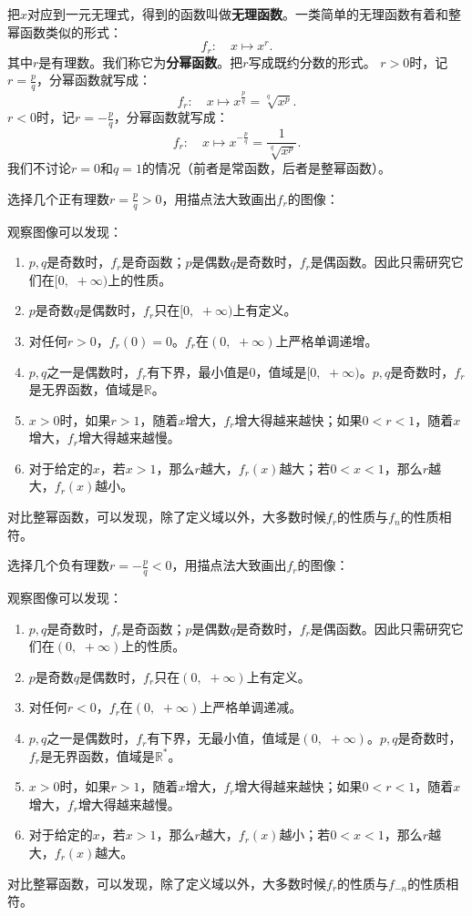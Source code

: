 \documentclass[12pt,UTF8]{ctexbook}
\begin{document}
把$x$对应到一元无理式，得到的函数叫做\textbf{无理函数}。一类简单的无理函数有着和整幂函数类似的形式：
$$ f_r : \quad x \mapsto x^r. $$
其中$r$是有理数。我们称它为\textbf{分幂函数}。把$r$写成既约分数的形式。
$r > 0$时，记$r = \frac{p}{q}$，分幂函数就写成：
$$ f_r : \quad x \mapsto x^\frac{p}{q} = \sqrt[q]{x^p}. $$
$r < 0$时，记$r = -\frac{p}{q}$，分幂函数就写成：
$$ f_r : \quad x \mapsto x^{-\frac{p}{q}} = \frac{1}{\sqrt[q]{x^p}} . $$
我们不讨论$r=0$和$q=1$的情况（前者是常函数，后者是整幂函数）。

选择几个正有理数$r = \frac{p}{q} > 0$，用描点法大致画出$f_r$的图像：


观察图像可以发现：
\begin{enumerate}
    \item $p, q$是奇数时，$f_r$是奇函数；$p$是偶数$q$是奇数时，$f_r$是偶函数。因此只需研究它们在$[0, \,\, +\infty)$上的性质。
    \item $p$是奇数$q$是偶数时，$f_r$只在$[0,\,\,  +\infty)$上有定义。
    \item 对任何$r > 0$，$f_r(0) = 0$。$f_r$在$(0, \,\, +\infty)$上严格单调递增。
    \item $p, q$之一是偶数时，$f_r$有下界，最小值是$0$，值域是$[0, \,\, +\infty)$。$p, q$是奇数时，$f_r$是无界函数，值域是$\mathbb{R}$。
    \item $x>0$时，如果$r>1$，随着$x$增大，$f_r$增大得越来越快；如果$0 < r < 1$，随着$x$增大，$f_r$增大得越来越慢。
    \item 对于给定的$x$，若$x>1$，那么$r$越大，$f_r(x)$越大；若$0 < x<1$，那么$r$越大，$f_r(x)$越小。
\end{enumerate}
对比整幂函数，可以发现，除了定义域以外，大多数时候$f_r$的性质与$f_n$的性质相符。

选择几个负有理数$r = -\frac{p}{q} < 0$，用描点法大致画出$f_r$的图像：


观察图像可以发现：
\begin{enumerate}
    \item $p, q$是奇数时，$f_r$是奇函数；$p$是偶数$q$是奇数时，$f_r$是偶函数。因此只需研究它们在$(0, \,\,  +\infty)$上的性质。
    \item $p$是奇数$q$是偶数时，$f_r$只在$(0, \,\, +\infty)$上有定义。
    \item 对任何$r < 0$，$f_r$在$(0, \,\, +\infty)$上严格单调递减。
    \item $p, q$之一是偶数时，$f_r$有下界，无最小值，值域是$(0, \,\, +\infty)$。$p, q$是奇数时，$f_r$是无界函数，值域是$\mathbb{R}^*$。
    \item $x>0$时，如果$r>1$，随着$x$增大，$f_r$增大得越来越快；如果$0 < r < 1$，随着$x$增大，$f_r$增大得越来越慢。
    \item 对于给定的$x$，若$x>1$，那么$r$越大，$f_r(x)$越小；若$0 < x<1$，那么$r$越大，$f_r(x)$越大。
\end{enumerate}
对比整幂函数，可以发现，除了定义域以外，大多数时候$f_r$的性质与$f_{-n}$的性质相符。
\end{document}
